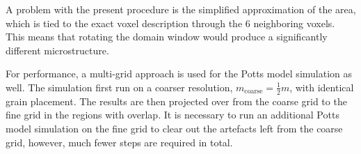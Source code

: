 \documentclass[3p,12pt]{elsarticle}
\begin{document}
A problem with the present procedure is the simplified approximation of the area, which is tied to the exact voxel description through the 6 neighboring voxels.
This means that rotating the domain window would produce a significantly different microstructure.



For performance, a multi-grid approach is used for the Potts model simulation as well.
The simulation first run on a coarser resolution, $m_\text{coarse} = \frac12 m$, with identical grain placement.
The results are then projected over from the coarse grid to the fine grid in the regions with overlap.
It is necessary to run an additional Potts model simulation on the fine grid to clear out the artefacts left from the coarse grid, however, much fewer steps are required in total.


\end{document}
